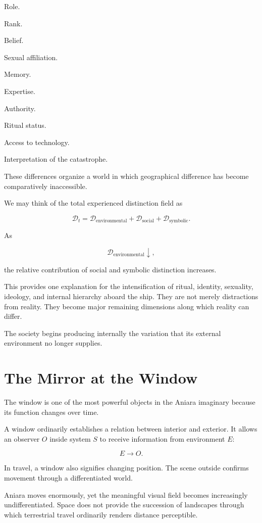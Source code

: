 \documentclass[11pt,oneside]{book}
\theoremstyle{definition}
\theoremstyle{remark}
\newcommand{\D}{\mathcal{D}}
\begin{document}
Role.

Rank.

Belief.

Sexual affiliation.

Memory.

Expertise.

Authority.

Ritual status.

Access to technology.

Interpretation of the catastrophe.

These differences organize a world in which geographical difference has become comparatively inaccessible.

We may think of the total experienced distinction field as

\[
\D_t
=
\D_{\mathrm{environmental}}
+
\D_{\mathrm{social}}
+
\D_{\mathrm{symbolic}}.
\]

As

\[
\D_{\mathrm{environmental}}\downarrow,
\]

the relative contribution of social and symbolic distinction increases.

This provides one explanation for the intensification of ritual, identity, sexuality, ideology, and internal hierarchy aboard the ship. They are not merely distractions from reality. They become major remaining dimensions along which reality can differ.

The society begins producing internally the variation that its external environment no longer supplies.

\section{The Mirror at the Window}

The window is one of the most powerful objects in the Aniara imaginary because its function changes over time.

A window ordinarily establishes a relation between interior and exterior. It allows an observer \(O\) inside system \(S\) to receive information from environment \(E\):

\[
E\rightarrow O.
\]

In travel, a window also signifies changing position. The scene outside confirms movement through a differentiated world.

Aniara moves enormously, yet the meaningful visual field becomes increasingly undifferentiated. Space does not provide the succession of landscapes through which terrestrial travel ordinarily renders distance perceptible.
\end{document}
